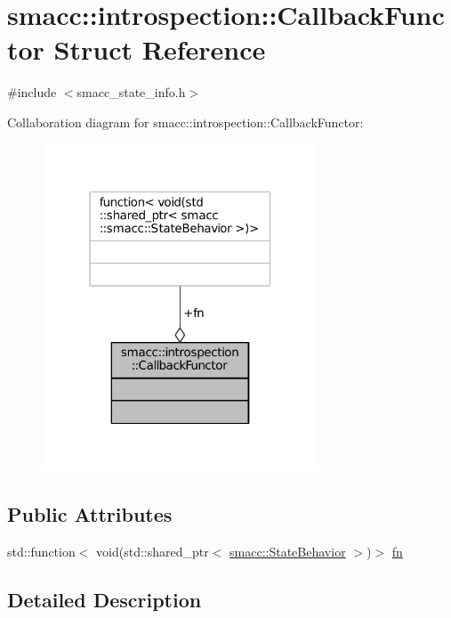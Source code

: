\hypertarget{structsmacc_1_1introspection_1_1CallbackFunctor}{}\section{smacc\+:\+:introspection\+:\+:Callback\+Functor Struct Reference}
\label{structsmacc_1_1introspection_1_1CallbackFunctor}


{\ttfamily \#include $<$smacc\+\_\+state\+\_\+info.\+h$>$}



Collaboration diagram for smacc\+:\+:introspection\+:\+:Callback\+Functor\+:
\nopagebreak
\begin{figure}[H]
\begin{center}
\leavevmode
\includegraphics[width=232pt]{structsmacc_1_1introspection_1_1CallbackFunctor__coll__graph}
\end{center}
\end{figure}
\subsection*{Public Attributes}
\begin{DoxyCompactItemize}
\item 
std\+::function$<$ void(std\+::shared\+\_\+ptr$<$ \hyperlink{classsmacc_1_1StateBehavior}{smacc\+::\+State\+Behavior} $>$)$>$ \hyperlink{structsmacc_1_1introspection_1_1CallbackFunctor_a61ff14c7fccf031d0e4afa54470ac220}{fn}
\end{DoxyCompactItemize}


\subsection{Detailed Description}


